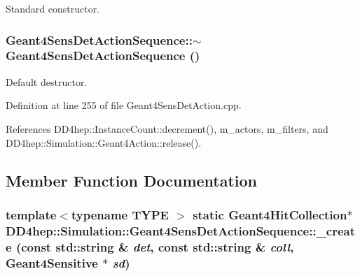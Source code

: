 Standard constructor. \hypertarget{class_d_d4hep_1_1_simulation_1_1_geant4_sens_det_action_sequence_a0e8473bdb136ab4eae734fd3305b4f05}{
\subsubsection[{$\sim$Geant4SensDetActionSequence}]{\setlength{\rightskip}{0pt plus 5cm}Geant4SensDetActionSequence::$\sim$Geant4SensDetActionSequence ()}}
\label{class_d_d4hep_1_1_simulation_1_1_geant4_sens_det_action_sequence_a0e8473bdb136ab4eae734fd3305b4f05}


Default destructor. 

Definition at line 255 of file Geant4SensDetAction.cpp.

References DD4hep::InstanceCount::decrement(), m\_\-actors, m\_\-filters, and DD4hep::Simulation::Geant4Action::release().

\subsection{Member Function Documentation}
\hypertarget{class_d_d4hep_1_1_simulation_1_1_geant4_sens_det_action_sequence_a1620735a4aa22fb041c0a8b31893bfe1}{
\subsubsection[{\_\-create}]{\setlength{\rightskip}{0pt plus 5cm}template$<$typename TYPE $>$ static {\bf Geant4HitCollection}$\ast$ DD4hep::Simulation::Geant4SensDetActionSequence::\_\-create (const std::string \& {\em det}, \/  const std::string \& {\em coll}, \/  {\bf Geant4Sensitive} $\ast$ {\em sd})}}
\label{class_d_d4hep_1_1_simulation_1_1_geant4_sens_det_action_sequence_a1620735a4aa22fb041c0a8b31893bfe1}


